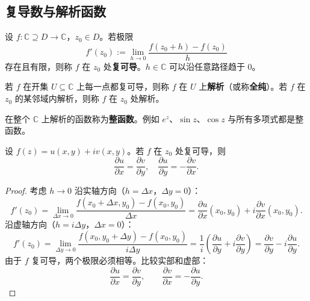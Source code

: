 \subsection{复导数与解析函数}\label{sec:analytic_functions}

\begin{definition}[复导数]\label{def:complex_derivative}
设 $f: \mathbb{C} \supseteq D \to \mathbb{C}$，$z_0 \in D$。若极限
\[
f'(z_0) := \lim_{h \to 0} \frac{f(z_0 + h) - f(z_0)}{h}
\]
存在且有限，则称 $f$ 在 $z_0$ 处\textbf{复可导}。$h \in \mathbb{C}$ 可以沿任意路径趋于 $0$。
\end{definition}

\begin{definition}[解析函数]\label{def:analytic_function}
若 $f$ 在开集 $U \subseteq \mathbb{C}$ 上每一点都复可导，则称 $f$ 在 $U$ 上\textbf{解析}（或称\textbf{全纯}）。若 $f$ 在 $z_0$ 的某邻域内解析，则称 $f$ 在 $z_0$ 处解析。
\end{definition}

\begin{definition}[整函数]\label{def:entire_function}
在整个 $\mathbb{C}$ 上解析的函数称为\textbf{整函数}。例如 $e^z$、$\sin z$、$\cos z$ 与所有多项式都是整函数。
\end{definition}

\begin{theorem}[柯西-黎曼方程]\label{thm:cauchy_riemann}
设 $f(z) = u(x,y) + i v(x,y)$。若 $f$ 在 $z_0$ 处复可导，则
\[
\frac{\partial u}{\partial x} = \frac{\partial v}{\partial y}, \quad \frac{\partial u}{\partial y} = -\frac{\partial v}{\partial x}.
\]
\end{theorem}

\begin{proof}
考虑 $h \to 0$ 沿实轴方向（$h = \Delta x$，$\Delta y = 0$）：
\[
f'(z_0) = \lim_{\Delta x \to 0} \frac{f(x_0+\Delta x, y_0) - f(x_0, y_0)}{\Delta x} = \frac{\partial u}{\partial x}(x_0,y_0) + i\frac{\partial v}{\partial x}(x_0,y_0).
\]
沿虚轴方向（$h = i\Delta y$，$\Delta x = 0$）：
\[
f'(z_0) = \lim_{\Delta y \to 0} \frac{f(x_0, y_0+\Delta y) - f(x_0, y_0)}{i\Delta y} = \frac{1}{i}\left(\frac{\partial u}{\partial y} + i\frac{\partial v}{\partial y}\right) = \frac{\partial v}{\partial y} - i\frac{\partial u}{\partial y}.
\]
由于 $f$ 复可导，两个极限必须相等。比较实部和虚部：
\[
\frac{\partial u}{\partial x} = \frac{\partial v}{\partial y}, \qquad \frac{\partial v}{\partial x} = -\frac{\partial u}{\partial y}.
\]
\end{proof}

